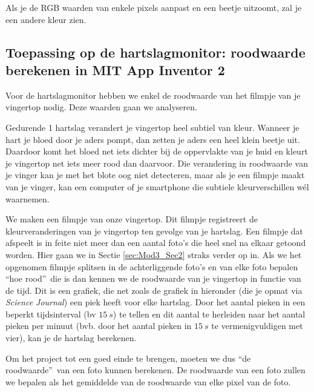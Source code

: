 Als je de RGB waarden van enkele pixels aanpast en een beetje uitzoomt, zal je een andere kleur zien.


\subsection{Toepassing op de hartslagmonitor: roodwaarde berekenen in MIT App Inventor 2}

Voor de hartslagmonitor hebben we enkel de roodwaarde van het filmpje van je vingertop nodig. Deze waarden gaan we analyseren.

Gedurende 1 hartslag verandert je vingertop heel subtiel van kleur. 
Wanneer je hart je bloed door je aders pompt, dan zetten je aders een heel klein beetje uit. Daardoor komt het bloed net iets dichter bij de oppervlakte van je huid en kleurt je vingertop net iets meer rood dan daarvoor.
Die verandering in roodwaarde van je vinger kan je met het blote oog niet detecteren, maar als je een filmpje maakt van je vinger, kan een computer of je smartphone die subtiele kleurverschillen w\'el waarnemen.

We maken een filmpje van onze vingertop. Dit filmpje registreert de kleurveranderingen van je vingertop ten gevolge van je hartslag. Een filmpje dat afspeelt is in feite niet meer dan een aantal foto's die heel snel na elkaar getoond worden. Hier gaan we in Sectie \ref{sec:Mod3_Sec2} straks verder op in. Als we het opgenomen filmpje splitsen in de achterliggende foto's en van elke foto bepalen \textquotedblleft hoe rood\textquotedblright \  die is dan kennen we de roodwaarde van je vingertop in functie van de tijd. Dit is een grafiek, die net zoals de grafiek in hieronder (die je opmat via \emph{Science Journal}) een piek heeft voor elke hartslag. Door het aantal pieken in een beperkt tijdsinterval (bv $15~s$) te tellen en dit aantal te herleiden naar het aantal pieken per minuut (bvb. door het aantal pieken in $15~s$ te vermenigvuldigen met vier), kan je de hartslag berekenen.


Om het project tot een goed einde te brengen, moeten we dus \textquotedblleft de roodwaarde\textquotedblright\  van een foto kunnen berekenen. 
De roodwaarde van een foto zullen we bepalen als het gemiddelde van de roodwaarde van elke pixel van de foto.


